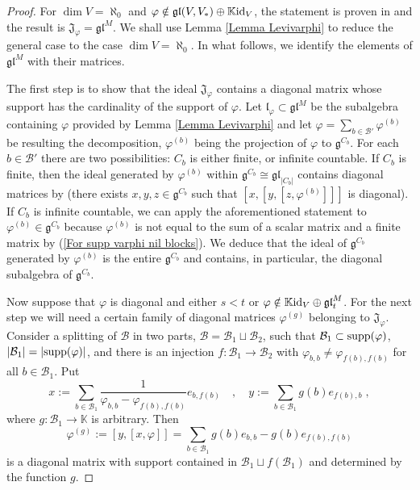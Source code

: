 \documentclass[12pt]{article}
\def\KK {{\mathbb K}}     %
\def\B  {\mathcal B}
\def\mk {\mathfrak}
\begin{document}
\begin{proof}
For $\dim V=\aleph_0$ and $\varphi\notin \mk{gl}(V,V_*)\oplus\KK{\rm id}_V$, the statement is proven in \cite[Corollary 6.6]{Penkov-Serganova-Mackey} and the result is $\mk J_\varphi=\mk{gl}^M$. We shall use Lemma \ref{Lemma Levivarphi} to reduce the general case to the case $\dim V=\aleph_0$. In what follows, we identify the elements of $\mk{gl}^M$ with their matrices.

The first step is to show that the ideal $\mk J_\varphi$ contains a diagonal matrix whose support has the cardinality of the support of $\varphi$. Let $\mk l_\varphi\subset \mk{gl}^M$ be the subalgebra containing $\varphi$ provided by Lemma \ref{Lemma Levivarphi} and let $\varphi=\sum\limits_{b\in\B'} \varphi^{(b)}$ be resulting the decomposition, $\varphi^{(b)}$ being the projection of $\varphi$ to $\mk g^{C_b}$. For each $b\in\B'$ there are two possibilities: $C_b$ is either finite, or infinite countable. If $C_b$ is finite, then the ideal generated by $\varphi^{(b)}$ within $\mk g^{C_b}\cong\mk{gl}_{|C_b|}$ contains diagonal matrices by \cite[Lemma 6.5]{Penkov-Serganova-Mackey} (there exists $x,y,z\in\mk g^{C_b}$ such that $[x,[y,[z,\varphi^{(b)}]]]$ is diagonal). If $C_b$ is infinite countable, we can apply the aforementioned statement \cite[Corollary 6.6]{Penkov-Serganova-Mackey} to $\varphi^{(b)}\in\mk g^{C_b}$ because $\varphi^{(b)}$ is not equal to the sum of a scalar matrix and a finite matrix by (\ref{For supp varphi nil blocks}). We deduce that the ideal of $\mk g^{C_b}$ generated by $\varphi^{(b)}$ is the entire $\mk g^{C_b}$ and contains, in particular, the diagonal subalgebra of $\mk g^{C_b}$. 

Now suppose that $\varphi$ is diagonal and either $s<t$ or $\varphi\notin\KK{\rm id}_V\oplus\mk{gl}^M_{t}$. For the next step we will need a certain family of diagonal matrices $\varphi^{(g)}$ belonging to $\mk{J}_\varphi$. Consider a splitting of $\B$ in two parts, $\B=\B_1\sqcup\B_2$, such that $\B_1\subset{\rm supp}(\varphi)$, $|\B_1|=|{\rm supp}(\varphi)|$, and there is an injection $f:\B_1\to\B_2$ with $\varphi_{b,b}\ne \varphi_{f(b),f(b)}$ for all $b\in\B_1$. Put
$$
x:=\sum\limits_{b\in\B_1} \frac{1}{\varphi_{b,b}-\varphi_{f(b),f(b)}} e_{b,f(b)} \quad,\quad y:=\sum\limits_{b\in\B_1} g(b) e_{f(b),b} \;,
$$
where $g:\B_1\to\KK$ is arbitrary. Then
$$
\varphi^{(g)}:=[y,[x,\varphi]]=\sum\limits_{b\in\B_1} g(b) e_{b,b} - g(b) e_{f(b),f(b)}
$$
is a diagonal matrix with support contained in $\B_1\sqcup f(\B_1)$ and determined by the function $g$.


\end{proof}
\end{document}
